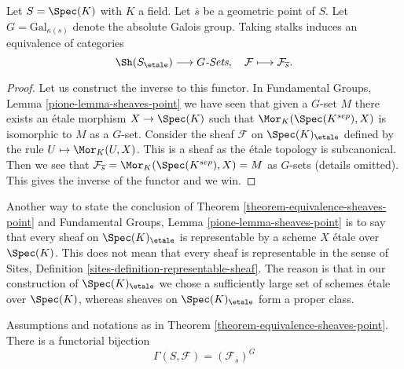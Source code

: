\begin{theorem}
\label{theorem-equivalence-sheaves-point}
Let $S = \Spec(K)$ with $K$ a field.
Let $\overline{s}$ be a geometric point of $S$.
Let $G = \text{Gal}_{\kappa(s)}$ denote the absolute Galois group.
Taking stalks induces an equivalence of categories
$$
\Sh(S_\etale) \longrightarrow G\textit{-Sets},
\quad
\mathcal{F} \longmapsto \mathcal{F}_{\overline{s}}.
$$
\end{theorem}

\begin{proof}
Let us construct the inverse to this functor. In
Fundamental Groups, Lemma \ref{pione-lemma-sheaves-point}
we have seen that given a $G$-set $M$ there exists an \'etale morphism
$X \to \Spec(K)$
such that $\Mor_K(\Spec(K^{sep}), X)$ is
isomorphic to $M$ as a $G$-set. Consider the sheaf
$\mathcal{F}$ on $\Spec(K)_\etale$ defined by
the rule $U \mapsto \Mor_K(U, X)$. This is a sheaf as the \'etale
topology is subcanonical. Then we see that
$\mathcal{F}_{\overline{s}} = \Mor_K(\Spec(K^{sep}), X) = M$
as $G$-sets (details omitted). This gives the inverse of the functor and
we win.
\end{proof}

\begin{remark}
\label{remark-every-sheaf-representable}
Another way to state the conclusion of
Theorem \ref{theorem-equivalence-sheaves-point} and
Fundamental Groups, Lemma \ref{pione-lemma-sheaves-point}
is to say that every sheaf on $\Spec(K)_\etale$ is representable
by a scheme $X$ \'etale over $\Spec(K)$.
This does not mean that every sheaf is representable in the sense of
Sites, Definition \ref{sites-definition-representable-sheaf}.
The reason is that in our construction of $\Spec(K)_\etale$
we chose a sufficiently large set of schemes \'etale over $\Spec(K)$,
whereas sheaves on $\Spec(K)_\etale$ form a proper class.
\end{remark}

\begin{lemma}
\label{lemma-global-sections-point}
Assumptions and notations as in
Theorem \ref{theorem-equivalence-sheaves-point}.
There is a functorial bijection
$$
\Gamma(S, \mathcal{F}) = (\mathcal{F}_{\overline{s}})^G
$$
\end{lemma}

